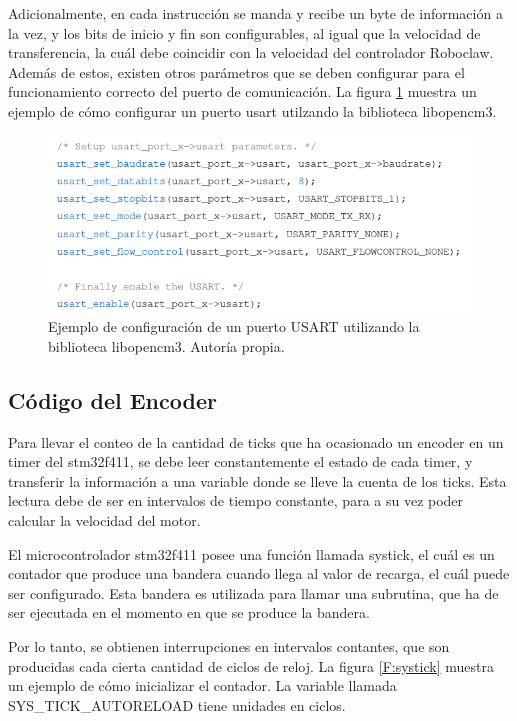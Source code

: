 Adicionalmente, en cada instrucción se manda y recibe un byte de información a la vez, y los bits de inicio y fin son configurables, al igual que la velocidad de transferencia, la cuál debe coincidir con la velocidad del controlador Roboclaw. Además de estos, existen otros parámetros que se deben configurar para el funcionamiento correcto del puerto de comunicación. La figura \ref{F:usart} muestra un ejemplo de cómo configurar un puerto usart utilzando la biblioteca libopencm3.

\begin{figure}[H]
\centering
\includegraphics[scale=0.5]{imagenes/usart.png}
\caption{Ejemplo de configuración de un puerto USART utilizando la biblioteca libopencm3. Autoría propia.}
\label{F:usart}
\end{figure}

\subsection{Código del Encoder}

Para llevar el conteo de la cantidad de ticks que ha ocasionado un encoder en un timer del stm32f411, se debe leer constantemente el estado de cada timer, y transferir la información a una variable donde se lleve la cuenta de los ticks. Esta lectura debe de ser en intervalos de tiempo constante, para a su vez poder calcular la velocidad del motor.

El microcontrolador stm32f411 posee una función llamada systick, el cuál es un contador que produce una bandera cuando llega al valor de recarga, el cuál puede ser configurado. Esta bandera es utilizada para llamar una subrutina, que ha de ser ejecutada en el momento en que se produce la bandera.

Por lo tanto, se obtienen interrupciones en intervalos contantes, que son producidas cada cierta cantidad de ciclos de reloj. La figura \ref{F:systick} muestra un ejemplo de cómo inicializar el contador. La variable llamada SYS\_TICK\_AUTORELOAD tiene unidades en ciclos.

